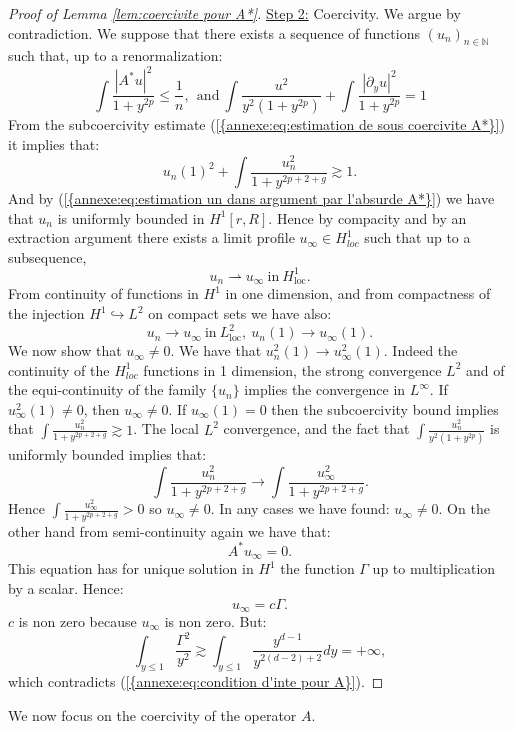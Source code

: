 \documentclass[11pt,a4paper,reqno]{amsart}
\theoremstyle{remark}
\numberwithin{equation}{section}
\begin{document}
\begin{appendix}
\begin{proof}[Proof of Lemma \ref{lem:coercivite pour A*}]
\underline{Step 2:} Coercivity. We argue by contradiction. We suppose that there exists a sequence of functions $(u_n)_{n\in\mathbb{N}}$ such that, up to a renormalization:
\begin{equation}\label{annexe:eq:estimation un dans argument par l'absurde A*}
\int \frac{|A^*u|^2}{1+y^{2p}}\leq \frac{1}{n}, \ \ \text{and} \ \int \frac{u^2}{y^2(1+y^{2p})}+\int \frac{|\partial_y u|^2}{1+y^{2p}}=1
\end{equation}
From the subcoercivity estimate {{\rm (\ref{{annexe:eq:estimation de sous coercivite A*}})}} it implies that:
$$
u_n(1)^2+\int \frac{u_n^2}{1+y^{2p+2+g}}\gtrsim 1 .
$$
And by {{\rm (\ref{{annexe:eq:estimation un dans argument par l'absurde A*}})}} we have that $u_n$ is uniformly bounded in $H^1[r,R]$. Hence by compacity and by an extraction argument there exists a limit profile $u_{\infty}\in H^1_{loc}$ such that up to a subsequence,
$$
u_n \rightharpoonup u_{\infty} \ \text{in} \ H^1_{\text{loc}} .
$$
From continuity of functions in $H^1$ in one dimension, and from compactness of the injection $H^1\hookrightarrow L^2$ on compact sets we have also:
$$
u_n \rightarrow u_{\infty} \ \text{in} \ L^2_{\text{loc}}, \ u_n(1)\rightarrow u_{\infty}(1) .
$$
We now show that $u_\infty \neq 0$. We have that $u_n^2(1)\rightarrow u_{\infty}^2(1)$. Indeed the continuity of the $H^1_{loc}$ functions in 1 dimension, the strong convergence $L^2$ and of the equi-continuity of the family $\{ u_n \}$ implies the convergence in $L^{\infty}$. If $u_{\infty}^2(1)\neq 0$, then $u_{\infty} \neq 0$. If $u_{\infty}(1)=0$ then the subcoercivity bound implies that $\int \frac{u_n^2}{1+y^{2p +2+g}}\gtrsim 1$. The local $L^2$ convergence, and the fact that $\int \frac{u_n^2}{y^2(1+y^{2p})}$ is uniformly bounded implies that:
$$
\int \frac{u_n^2}{1+y^{2p+2+g}}\rightarrow \int \frac{u_{\infty}^2}{1+y^{2p+2+g}}.
$$
Hence $\int \frac{u_{\infty}^2}{1+y^{2p+2+g}}>0$ so $u_{\infty}\neq 0$. In any cases we have found: $u_{\infty}\neq 0$. On the other hand from semi-continuity again we have that:
$$
A^* u_{\infty}=0 .
$$
This equation has for unique solution in $H^1$ the function $\Gamma$ up to multiplication by a scalar. Hence:
$$
u_{\infty}=c\Gamma .
$$ 
$c$ is non zero because $u_{\infty}$ is non zero. But:
$$
\int_{y\leq 1} \frac{\Gamma^2}{y^2}\gtrsim \int_{y\leq 1} \frac{y^{d-1}}{y^{2(d-2)+2}}dy=+\infty ,
$$
which contradicts {{\rm (\ref{{annexe:eq:condition d'inte pour A}})}}.
\end{proof}

We now focus on the coercivity of the operator $A$.


\end{appendix}
\end{document}
